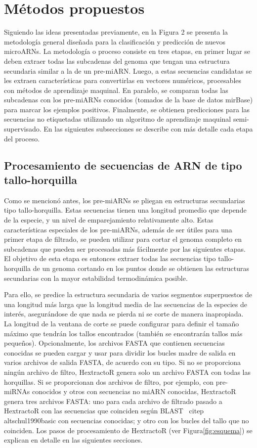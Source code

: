 \chapter{Métodos propuestos}
Siguiendo las ideas presentadas previamente, en la Figura 2 se presenta la metodología general diseñada para la clasificación y predicción de nuevos
microARNs. La metodología o proceso consiste en tres etapas, en primer lugar se deben extraer todas las subcadenas del genoma que tengan una estructura
secundaria similar a la de un pre-miARN. Luego, a estas secuencias candidatas se les extraen características para convertirlas en vectores numéricos,
procesables con métodos de aprendizaje maquinal. En paralelo, se comparan todas las subcadenas con los pre-miARNs conocidos (tomados de la base de datos mirBase)
para marcar los ejemplos positivos. Finalmente, se obtienen predicciones para las secuencias no etiquetadas utilizando un algoritmo de aprendizaje maquinal
semi-supervisado. En las siguientes subsecciones se describe con más detalle cada etapa del proceso.

\section{Procesamiento de secuencias de ARN de tipo tallo-horquilla}
Como se mencionó antes, los pre-miARNs se pliegan en estructuras secundarias tipo tallo-horquilla. Estas secuencias tienen una longitud promedio que depende
de la especie, y un nivel de emparejamiento relativamente alto. Estas características especiales de los pre-miARNs, además de ser útiles para una primer
etapa de filtrado, se pueden utilizar para cortar el genoma completo en subcadenas que pueden ser procesadas más fácilmente por las siguientes etapas. El
objetivo de esta etapa es entonces extraer todas las secuencias tipo tallo-horquilla de un genoma cortando en los puntos donde se obtienen las estructuras
secundarias con la mayor estabilidad termodinámica posible.

Para ello, se predice la estructura secundaria de varios segmentos superpuestos de una longitud más larga que la longitud media de las secuencias de la
especies de interés, asegurándose de que nada se pierda ni se corte de manera inapropiada. La longitud de la ventana de corte se puede configurar para
definir el tamaño máximo que tendrán los tallos encontrados (también se encontrarán tallos más pequeños). Opcionalmente, los archivos FASTA que contienen
secuencias conocidas se pueden cargar y usar para dividir los bucles madre de salida en varios archivos de salida FASTA, de acuerdo con su tipo. Si no se
proporciona ningún archivo de filtro, HextractoR genera solo un archivo FASTA con todas las horquillas. Si se proporcionan dos archivos de filtro, por ejemplo,
con pre-miRNAs conocidos y otros con secuencias no miARN conocidas, HextractoR genera tres archivos FASTA: uno para cada archivo de filtrado pasado a HextractoR
con las secuencias que coinciden según BLAST \ citep {altschul1990basic} con secuencias conocidas; y otro con los bucles del tallo que no coinciden. Los pasos
de procesamiento de HextractoR (ver Figura\ref{fig:esquema}) se explican en detalle en las siguientes secciones.

